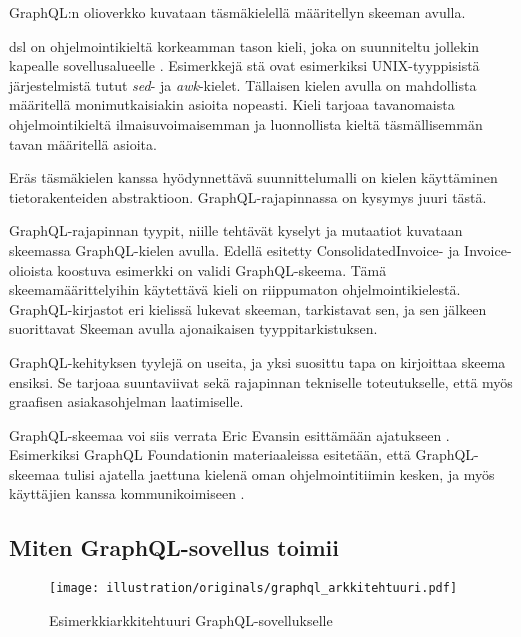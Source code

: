 GraphQL:n olioverkko kuvataan täsmäkielellä määritellyn skeeman avulla.

\Gls{dsl} on ohjelmointikieltä korkeamman tason kieli, joka on
suunniteltu jollekin kapealle sovellusalueelle \cite{landin1966next}.
Esimerkkejä stä ovat esimerkiksi UNIX-tyyppisistä
järjestelmistä tutut \emph{sed}- ja \emph{awk}-kielet. Tällaisen kielen
avulla on mahdollista määritellä monimutkaisiakin asioita nopeasti.
\cite{Raymond2003} Kieli tarjoaa tavanomaista ohjelmointikieltä
ilmaisuvoimaisemman ja luonnollista kieltä täsmällisemmän tavan
määritellä asioita.

Eräs täsmäkielen kanssa hyödynnettävä suunnittelumalli on kielen
käyttäminen tietorakenteiden abstraktioon\cite{Spi00b}.
GraphQL-rajapinnassa on kysymys juuri tästä.

GraphQL-rajapinnan tyypit, niille tehtävät kyselyt ja mutaatiot kuvataan
skeemassa GraphQL-kielen avulla. Edellä esitetty ConsolidatedInvoice- ja
Invoice-olioista koostuva esimerkki on validi GraphQL-skeema. Tämä
skeemamäärittelyihin käytettävä kieli on riippumaton
ohjelmointikielestä. GraphQL-kirjastot eri kielissä lukevat skeeman,
tarkistavat sen, ja sen jälkeen suorittavat Skeeman avulla ajonaikaisen
tyyppitarkistuksen.

GraphQL-kehityksen tyylejä on useita, ja yksi suosittu tapa on
kirjoittaa skeema ensiksi. Se tarjoaa suuntaviivat sekä rajapinnan
tekniselle toteutukselle, että myös graafisen asiakasohjelman
laatimiselle.\cites{SchemaDriven2017Nov}{SchemaDrivenDesign2021Jul}

GraphQL-skeemaa voi siis verrata Eric Evansin esittämään ajatukseen
. Esimerkiksi GraphQL
Foundationin materiaaleissa esitetään, että GraphQL-skeemaa tulisi
ajatella jaettuna kielenä oman ohjelmointitiimin kesken, ja myös
käyttäjien kanssa kommunikoimiseen .\citep{thinkingInGraphs}

\hypertarget{miten-graphql-sovellus-toimii}{%
\subsection{Miten GraphQL-sovellus
toimii}\label{miten-graphql-sovellus-toimii}}

\begin{figure}
\centering
\texttt{[image: illustration/originals/graphql\_arkkitehtuuri.pdf]}
\caption{\label{graphqlarkkitehtuuri} Esimerkkiarkkitehtuuri
GraphQL-sovellukselle}
\end{figure}

